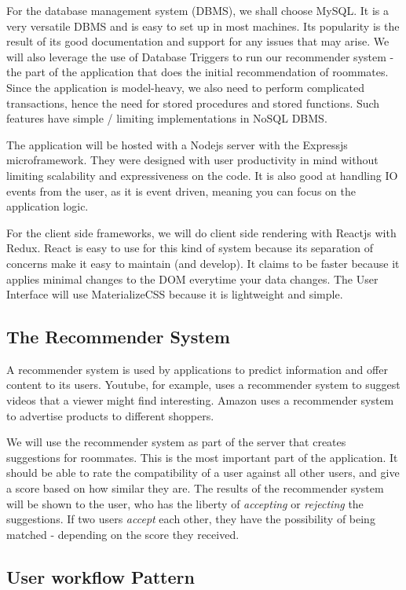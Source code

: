\documentclass[journal]{./IEEE/IEEEtran}
\begin{document}
For the database management system (DBMS), we shall choose MySQL. It is a very versatile DBMS and is easy to set up in most machines. Its popularity is the result of its good documentation and support for any issues that may arise. We will also leverage the use of Database Triggers to run our recommender system - the part of the application that does the initial recommendation of roommates. Since the application is model-heavy, we also need to perform complicated transactions, hence the need for stored procedures and stored functions. Such features have simple / limiting implementations in NoSQL DBMS.

The application will be hosted with a Nodejs server with the Expressjs microframework. They were designed with user productivity in mind without limiting scalability and expressiveness on the code. It is also good at handling IO events from the user, as it is event driven, meaning you can focus on the application logic.

For the client side frameworks, we will do client side rendering with Reactjs with Redux. React is easy to use for this kind of system because its separation of concerns make it easy to maintain (and develop). It claims to be faster because it applies minimal changes to the DOM everytime your data changes. The User Interface will use MaterializeCSS because it is lightweight and simple.

\subsection{The Recommender System}
A recommender system is used by applications to predict information and offer content to its users\cite{katarya}. Youtube, for example, uses a recommender system to suggest videos that a viewer might find interesting. Amazon uses a recommender system to advertise products to different shoppers.

We will use the recommender system as part of the server that creates suggestions for roommates. This is the most important part of the application. It should be able to rate the compatibility of a user against all other users, and give a score based on how similar they are. The results of the recommender system will be shown to the user, who has the liberty of \textit{accepting} or \textit{rejecting} the suggestions. If two users \textit{accept} each other, they have the possibility of being matched - depending on the score they received.

\subsection{User workflow Pattern}
\end{document}
